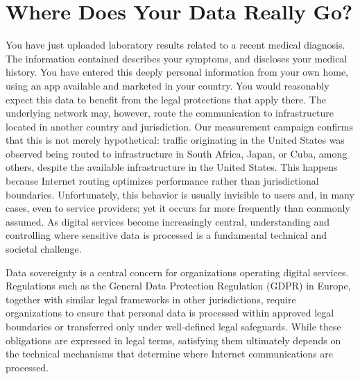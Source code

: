 \documentclass[acmsmall]{acmart}
\begin{document}



\maketitle

\section{Where Does Your Data Really Go?}
\label{sec:introduction}
You have just uploaded laboratory results related to a recent medical diagnosis. The information contained describes your symptoms, and discloses your medical history. You have entered this deeply personal information from your own home, using an app available and marketed in your country. You would reasonably expect this data to benefit from the legal protections that apply there. The underlying network may, however, route the communication to infrastructure located in another country and jurisdiction. Our measurement campaign confirms that this is not merely hypothetical: traffic originating in the United States was observed being routed to infrastructure in South Africa, Japan, or Cuba, among others, despite the available infrastructure in the United States. This happens because Internet routing optimizes performance rather than jurisdictional boundaries. Unfortunately, this behavior is usually invisible to users and, in many cases, even to service providers; yet it occurs far more frequently than commonly assumed. As digital services become increasingly central, understanding and controlling where sensitive data is processed is a fundamental technical and societal challenge.

Data sovereignty is a central concern for organizations operating digital services. Regulations such as the General Data Protection Regulation (GDPR) in Europe, together with similar legal frameworks in other jurisdictions, require organizations to ensure that personal data is processed within approved legal boundaries or transferred only under well-defined legal safeguards. While these obligations are expressed in legal terms, satisfying them ultimately depends on the technical mechanisms that determine where Internet communications are processed.
\end{document}
